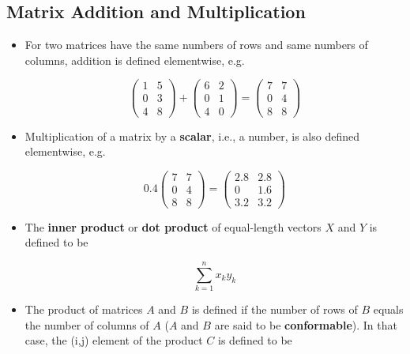 \subsection{Matrix Addition and Multiplication}

\begin{itemize}

\item For two matrices have the same numbers of rows and same numbers of
columns, addition is defined elementwise, e.g.

\begin{equation}
\left (
\begin{array}{cc}
1 & 5 \\
0 & 3 \\
4 & 8 
\end{array}
\right ) +
\left (
\begin{array}{cc}
6 & 2 \\
0 & 1 \\
4 & 0 
\end{array}
\right ) =
\left (
\begin{array}{cc}
7 & 7 \\
0 & 4 \\
8 & 8 
\end{array}
\right ) 
\end{equation}

\item Multiplication of a matrix by a {\bf scalar}, i.e., a number, is also
defined elementwise, e.g.

\begin{equation}
0.4 \left (
\begin{array}{cc}
7 & 7 \\
0 & 4 \\
8 & 8 
\end{array}
\right ) =
\left (
\begin{array}{cc}
2.8 & 2.8 \\
0 & 1.6 \\
3.2 & 3.2 
\end{array}
\right ) 
\end{equation}

\item The {\bf inner product} or {\bf dot product} of equal-length
vectors $X$ and $Y$ is defined to be

\begin{equation}
\sum_{k=1}^n x_k y_k
\end{equation}

\item The product of matrices $A$ and $B$ is defined if the number of rows
of $B$ equals the number of columns of $A$ ($A$ and $B$ are said to be {\bf
conformable}).  In that case, the (i,j) element of the product $C$ is
defined to be


\end{itemize}
